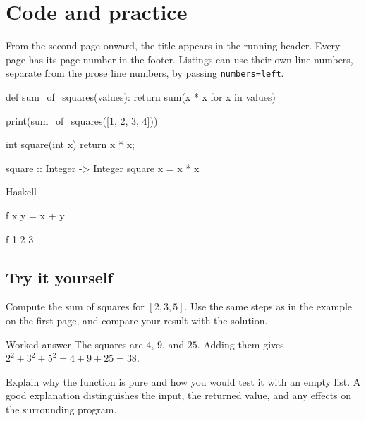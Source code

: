 \documentclass[onecolumn,nolinenumbers]{baysheet}
\begin{document}
\section{Code and practice}
From the second page onward, the title appears in the running header.
Every page has its page number in the footer.
Listings can use their own line numbers, separate from the prose line
numbers, by passing \texttt{numbers=left}.

\begin{python}[numbers=left]
def sum_of_squares(values):
    return sum(x * x for x in values)

print(sum_of_squares([1, 2, 3, 4]))
\end{python}

\begin{java}
int square(int x) {
    return x * x;
}
\end{java}

\begin{haskell}
square :: Integer -> Integer
square x = x * x
\end{haskell}

\begin{codebox}{Haskell}
\begin{plainhaskell}
f x y = x + y
\end{plainhaskell}
\begin{terminal}
f 1 2
3
\end{terminal}
\end{codebox}

\subsection{Try it yourself}
Compute the sum of squares for $[2,3,5]$. Use the same steps as in the
example on the first page, and compare your result with the solution.

\begin{solutionbox}{Worked answer}
The squares are $4$, $9$, and $25$. Adding them gives
$2^2+3^2+5^2=4+9+25=38$.
\end{solutionbox}

Explain why the function is pure and how you would test it with an empty
list. A good explanation distinguishes the input, the returned value,
and any effects on the surrounding program.
\end{document}
